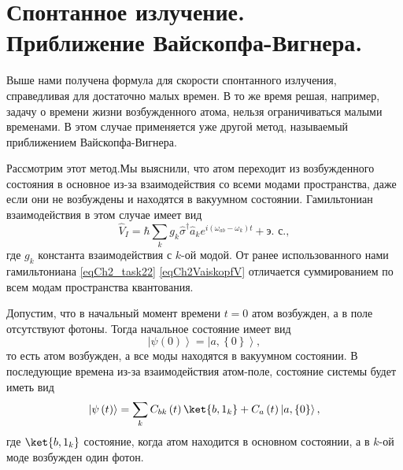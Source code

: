 \section{Спонтанное излучение. \\
  Приближение Вайскопфа-Вигнера.}
Выше нами получена формула для скорости спонтанного излучения,
справедливая для достаточно малых времен. В то же время решая,
например, задачу о времени жизни возбужденного атома, нельзя
ограничиваться малыми временами. В этом случае применяется уже другой
метод, называемый приближением Вайскопфа-Вигнера.

Рассмотрим этот метод.Мы выяснили, что атом переходит из возбужденного
состояния в основное из-за взаимодействия со всеми модами
пространства, даже если они не возбуждены и находятся в вакуумном
состоянии. Гамильтониан взаимодействия в этом случае имеет вид
\begin{equation}
\hat{V}_I = \hbar \sum_{k} g_k \hat{\sigma}^{\dag}\hat{a}_k e^{i\left(
\omega_{ab} - \omega_k
\right)t} + \mbox{э. с.},
\label{eqCh2VaiskopfV}
\end{equation}
где $g_k$ константа взаимодействия с $k$-ой модой. От ранее
использованного нами гамильтониана \eqref{eqCh2_task22}
\eqref{eqCh2VaiskopfV} отличается суммированием по всем модам
пространства квантования. 

Допустим, что в начальный момент времени $t=0$ атом возбужден, а в
поле отсутствуют фотоны. Тогда начальное состояние имеет вид
\begin{equation}
\left|\psi\left(0\right)\right> =
 \left|a, \left\{0\right\}\right>,
\nonumber
\end{equation}
то есть атом возбужден, а все моды находятся в вакуумном состоянии. В
последующие времена из-за взаимодействия атом-поле, состояние системы
будет иметь вид
\begin{equation}
\left|\psi\left(t\right)\right> =
\sum_{k} C_{bk}\left(t\right) \ket{b, 1_k}
+
C_{a}\left(t\right) \left|a, \left\{0\right\}\right>,
\label{eqCh2Vaiskopf3}
\end{equation}
где $\ket{b, 1_k}$ состояние, когда атом находится в основном
состоянии, а в $k$-ой моде возбужден один фотон. 

